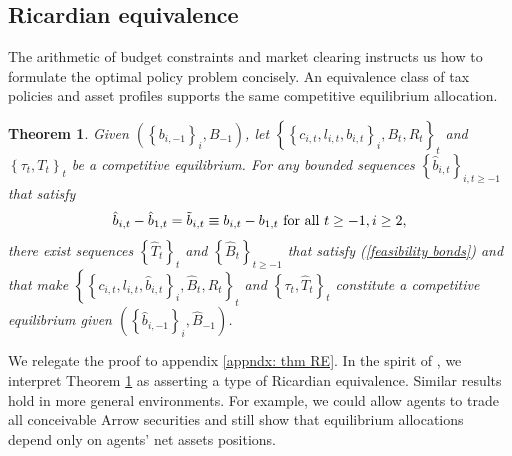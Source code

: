\documentclass[thmsb,11pt]{article}
\newtheorem{theorem}{Theorem}
\begin{document}
\color{black}

\subsection{Ricardian equivalence \label{sec:Ricardian101}}
The arithmetic of budget constraints and market clearing instructs us how to  formulate the optimal policy problem concisely.
An equivalence class of tax policies and asset profiles supports the same competitive equilibrium allocation.

\begin{theorem}
\label{theorem: main} Given $\left( \left \{ b_{i,-1}\right \}
_{i},B_{-1}\right) $, let $\left \{ \left \{ c_{i,t},l_{i,t},b_{i,t}\right \} _{i},B_{t},R_{t}\right \} _{t} $ and $\left \{ \tau _{t},T_{t}\right
\} _{t}$ be a competitive equilibrium. For any bounded sequences $%
\left \{ \hat{b}_{i,t}\right \} _{i,t\geq -1}$ that satisfy
\begin{equation*}
\hat{b}_{i,t}-\hat{b}_{1,t}=\tilde{b}_{i,t}\equiv b_{i,t}	-b_{1,t} \ \text{\rm  for all }t\geq -1,i\geq 2,
\end{equation*}%
there exist  sequences $\left \{ \hat{T}_{t}\right \} _{t}$ and $%
\left \{ \hat{B}_{t}\right \} _{t\geq -1}$ that satisfy (\ref{feasibility
bonds}) and that make $\left \{ \left \{ c_{i,t},l_{i,t},\hat{b}%
_{i,t}\right \} _{i},\hat{B}_{t},R_{t}\right \} _{t}$ and $\left \{
\tau _{t},\hat{T}_{t}\right \} _{t}$ constitute a competitive
equilibrium given $\left( \left \{ \hat{b}_{i,-1}\right \} _{i},\hat{B}%
_{-1}\right) $.
\end{theorem}



We relegate the proof to appendix \ref{appndx: thm RE}. In the spirit of \citet{Barro1974}, we interpret Theorem \ref{theorem: main} as  asserting a type of  Ricardian equivalence.
Similar results  hold in more general environments. For example, we could allow
agents to trade all conceivable  Arrow securities and still show that  equilibrium allocations depend only on agents' net assets positions.
\end{document}
